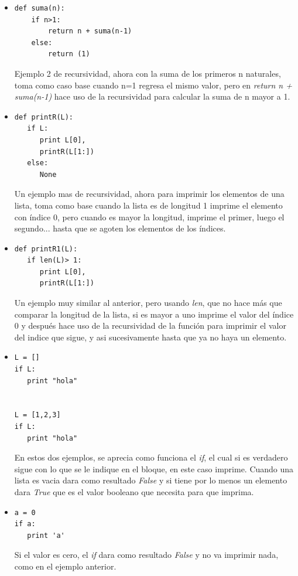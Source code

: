 \documentclass[letterpaper, 12pt,oneside]{article}
\begin{document}
\begin{enumerate}
\begin{itemize}
				
				\item \begin{lstlisting}
def suma(n):
    if n>1:
        return n + suma(n-1)
    else:
        return (1)
				\end{lstlisting} Ejemplo 2 de recursividad, ahora con la suma de los primeros n naturales, toma como caso base cuando n=1 regresa el mismo valor, pero en \textit{return n + suma(n-1)} hace uso de la recursividad para calcular la suma de n mayor a 1.\\
				
				\item \begin{lstlisting}
def printR(L):
   if L:
      print L[0],
      printR(L[1:])
   else:
      None
				\end{lstlisting} Un ejemplo mas de recursividad, ahora para imprimir los elementos de una lista, toma como base cuando la lista es de longitud 1 imprime el elemento con índice 0, pero cuando es mayor la longitud, imprime el primer, luego el segundo... hasta que se agoten los elementos de los índices.\\
				
				
				\item \begin{lstlisting}
def printR1(L):
   if len(L)> 1:
      print L[0],
      printR(L[1:])
				\end{lstlisting} Un ejemplo muy similar al anterior, pero usando \textit{len}, que no hace más que comparar la longitud de la lista, si es mayor a uno imprime el valor del índice 0 y después hace uso de la recursividad de la función para imprimir el valor del indice que sigue, y asi sucesivamente hasta que ya no haya un elemento.\\
			
					
				\item \begin{lstlisting}
L = []
if L:
   print "hola"
   
   
L = [1,2,3]
if L:
   print "hola"   
				\end{lstlisting} En estos dos ejemplos, se aprecia como funciona el \textit{if}, el cual si es verdadero sigue con lo que se le indique en el bloque, en este caso imprime. Cuando una lista es vacia dara como resultado \textit{False} y si tiene por lo menos un elemento dara \textit{True} que es el valor booleano que necesita para que imprima.\\
				\item \begin{lstlisting}
a = 0 
if a: 
   print 'a'
				\end{lstlisting} Si el valor es cero, el \textit{if} dara como resultado \textit{False} y no va imprimir nada, como en el ejemplo anterior. 
			
				
				
			\end{itemize}
		
		
		
			
			
		
		
	\end{enumerate}
	
	
	
	
	
	
	
	
	
	
	
\end{document}
